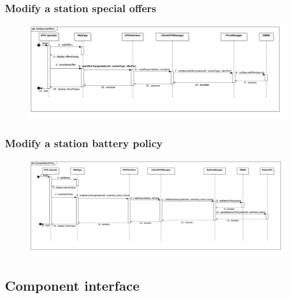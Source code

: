 \subsubsection{Modify a station special offers}
\begin{figure}[H]
    \begin{center}
        \includegraphics[width=\textwidth]{img/runtime/cpo_offers}
    \end{center}
\end{figure}
\subsubsection{Modify a station battery policy}
\begin{figure}[H]
    \begin{center}
        \includegraphics[width=\textwidth]{img/runtime/cpo_battery}
    \end{center}
\end{figure}
\subsection{Component interface}

